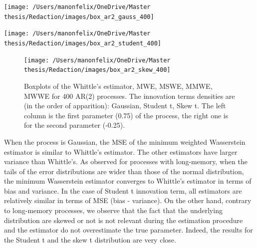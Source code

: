 \documentclass[
  11pt,
]{article}
\begin{document}
\begin{center}\texttt{[image: /Users/manonfelix/OneDrive/Master thesis/Redaction/images/box\_ar2\_gauss\_400]} \end{center}

\begin{center}\texttt{[image: /Users/manonfelix/OneDrive/Master thesis/Redaction/images/box\_ar2\_student\_400]} \end{center}

\begin{figure}

{\centering \texttt{[image: /Users/manonfelix/OneDrive/Master thesis/Redaction/images/box\_ar2\_skew\_400]} 

}

\caption{Boxplots of the Whittle's estimator, MWE, MSWE, MMWE, MWWE for 400 AR(2) processes. The innovation terms densities are (in the order of apparition): Gaussian, Student t, Skew t. The left column is the first parameter (0.75) of the process, the right one is for the second parameter (-0.25).}\label{fig:box_ar2}
\end{figure}

When the process is Gaussian, the MSE of the minimum weighted
Wasserstein estimator is similar to Whittle's estimator. The other
estimators have larger variance than Whittle's. As observed for
processes with long-memory, when the tails of the error distributions
are wider than those of the normal distribution, the minimum Wasserstein
estimator converges to Whittle's estimator in terms of bias and
variance. In the case of Student t innovation term, all estimators are
relatively similar in terms of MSE (bias - variance). On the other hand,
contrary to long-memory processes, we observe that the fact that the
underlying distribution are skewed or not is not relevant during the
estimation procedure and the estimator do not overestimate the true
parameter. Indeed, the results for the Student t and the skew t
distribution are very close.
\end{document}
